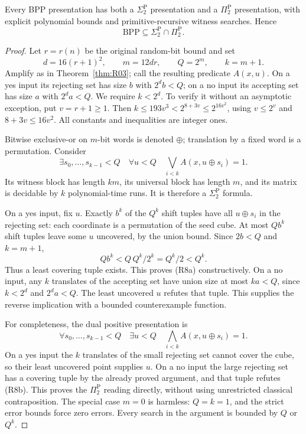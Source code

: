 \begin{theorem}\label{thm:R08}
Every BPP presentation has both a $\Sigma^\mathrm P_2$ presentation and a
$\Pi^\mathrm P_2$ presentation, with explicit polynomial bounds and
primitive-recursive witness searches. Hence
\[
 \mathrm{BPP}\subseteq\Sigma^\mathrm P_2\cap\Pi^\mathrm P_2.
\]
\end{theorem}
\begin{proof}
Let $r=r(n)$ be the original random-bit bound and set
\[
 d=16(r+1)^2,\qquad m=12dr,\qquad Q=2^m,\qquad k=m+1.
\]
Amplify as in Theorem~\ref{thm:R03}; call the resulting predicate $A(x,u)$.
On a yes input its rejecting set has size $b$ with $2^d b<Q$; on a no
input its accepting set has size $a$ with $2^d a<Q$.
We require $k<2^d$. To verify it without an asymptotic exception, put
$v=r+1\geq1$. Then $k\leq193v^3<2^{8+3v}\leq2^{16v^2}$, using
$v\leq2^v$ and $8+3v\leq16v^2$. All constants and inequalities are
integer ones.

Bitwise exclusive-or on $m$-bit words is denoted $\oplus$; translation
by a fixed word is a permutation. Consider
\[
 \exists s_0,\ldots,s_{k-1}<Q\quad
 \forall u<Q\quad \bigvee_{i<k} A(x,u\oplus s_i)=1.                 \tag{R8a}
\]
Its witness block has length $km$, its universal block has length $m$,
and its matrix is decidable by $k$ polynomial-time runs. It is therefore
a $\Sigma^\mathrm P_2$ formula.

On a yes input, fix $u$. Exactly $b^k$ of the $Q^k$ shift tuples have all
$u\oplus s_i$ in the rejecting set: each coordinate is a permutation of
the seed cube. At most $Qb^k$ shift tuples leave some $u$ uncovered, by
the union bound. Since $2b<Q$ and $k=m+1$,
\[
 Qb^k < Q\,Q^k/2^k = Q^k/2 < Q^k.
\]
Thus a least covering tuple exists. This proves (R8a) constructively.
On a no input, any $k$ translates of the accepting set have union size
at most $ka<Q$, since $k<2^d$ and $2^d a<Q$. The least uncovered $u$
refutes that tuple. This supplies the reverse implication with a bounded
counterexample function.

For completeness, the dual positive presentation is
\[
 \forall s_0,\ldots,s_{k-1}<Q\quad
 \exists u<Q\quad \bigwedge_{i<k} A(x,u\oplus s_i)=1.              \tag{R8b}
\]
On a yes input the $k$ translates of the small rejecting set cannot cover
the cube, so their least uncovered point supplies $u$. On a no input the
large rejecting set has a covering tuple by the already proved argument,
and that tuple refutes (R8b). This proves the $\Pi^\mathrm P_2$ reading
directly, without using unrestricted classical contraposition. The special
case $m=0$ is harmless: $Q=k=1$, and the strict error bounds force zero
errors. Every search in the argument is bounded by $Q$ or $Q^k$.
\end{proof}

